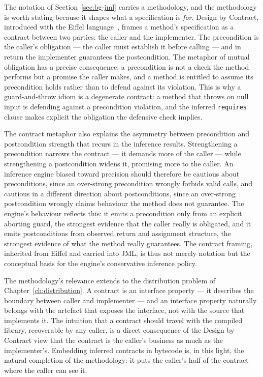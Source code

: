 The notation of Section~\ref{sec:bg-jml} carries a methodology, and the
methodology is worth stating because it shapes what a specification is
\emph{for}. Design by Contract, introduced with the Eiffel
language~\cite{meyer1992design}, frames a method's specification as a contract
between two parties: the caller and the implementer. The precondition is the
caller's obligation --- the caller must establish it before calling --- and in
return the implementer guarantees the postcondition. The metaphor of mutual
obligation has a precise consequence: a precondition is not a check the method
performs but a promise the caller makes, and a method is entitled to assume its
precondition holds rather than to defend against its violation. This is why a
guard-and-throw idiom is a degenerate contract: a method that throws on null
input is defending against a precondition violation, and the inferred
\texttt{requires} clause makes explicit the obligation the defensive check
implies.

The contract metaphor also explains the asymmetry between precondition and
postcondition strength that recurs in the inference results. Strengthening a
precondition narrows the contract --- it demands more of the caller --- while
strengthening a postcondition widens it, promising more to the caller. An
inference engine biased toward precision should therefore be cautious about
preconditions, since an over-strong precondition wrongly forbids valid calls, and
cautious in a different direction about postconditions, since an over-strong
postcondition wrongly claims behaviour the method does not guarantee. The
engine's behaviour reflects this: it emits a precondition only from an explicit
aborting guard, the strongest evidence that the caller really is obligated, and
it emits postconditions from observed return and assignment structure, the
strongest evidence of what the method really guarantees. The contract framing,
inherited from Eiffel and carried into JML, is thus not merely notation but the
conceptual basis for the engine's conservative inference policy.

The methodology's relevance extends to the distribution problem of
Chapter~\ref{ch:distribution}. A contract is an interface property --- it
describes the boundary between caller and implementer --- and an interface
property naturally belongs with the artefact that exposes the interface, not with
the source that implements it. The intuition that a contract should travel with
the compiled library, recoverable by any caller, is a direct consequence of the
Design by Contract view that the contract is the caller's business as much as the
implementer's. Embedding inferred contracts in bytecode is, in this light, the
natural completion of the methodology: it puts the caller's half of the contract
where the caller can see it.

